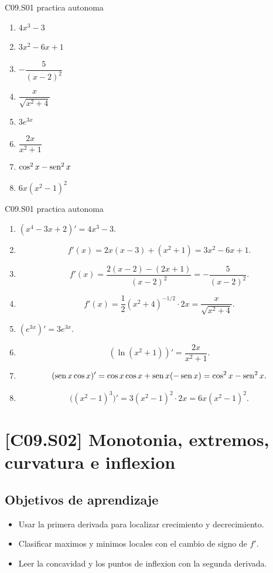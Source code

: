 \begin{shortanswer}{C09.S01 practica autonoma}
\begin{enumerate}[label=\textbf{PX-C09.S01-\arabic*:}, leftmargin=*]
  \item \(4x^3-3\)
  \item \(3x^2-6x+1\)
  \item \(-\dfrac{5}{(x-2)^2}\)
  \item \(\dfrac{x}{\sqrt{x^2+4}}\)
  \item \(3e^{3x}\)
  \item \(\dfrac{2x}{x^2+1}\)
  \item \(\cos^2 x-\operatorname{sen}^2 x\)
  \item \(6x(x^2-1)^2\)
\end{enumerate}
\end{shortanswer}

\begin{fullsolution}{C09.S01 practica autonoma}
\begin{enumerate}[label=\textbf{PX-C09.S01-\arabic*:}, leftmargin=*]
  \item \((x^4-3x+2)'=4x^3-3\).
  \item
  \[
  f'(x)=2x(x-3)+(x^2+1)=3x^2-6x+1.
  \]
  \item
  \[
  f'(x)=\frac{2(x-2)-(2x+1)}{(x-2)^2}=-\frac{5}{(x-2)^2}.
  \]
  \item
  \[
  f'(x)=\frac{1}{2}(x^2+4)^{-1/2}\cdot 2x=\frac{x}{\sqrt{x^2+4}}.
  \]
  \item \((e^{3x})'=3e^{3x}\).
  \item
  \[
  (\ln(x^2+1))'=\frac{2x}{x^2+1}.
  \]
  \item
  \[
  (\operatorname{sen} x\cos x)'=\cos x\cos x+\operatorname{sen} x(-\operatorname{sen} x)=\cos^2 x-\operatorname{sen}^2 x.
  \]
  \item
  \[
  \bigl((x^2-1)^3\bigr)'=3(x^2-1)^2\cdot 2x=6x(x^2-1)^2.
  \]
\end{enumerate}
\end{fullsolution}

\section{[C09.S02] Monotonia, extremos, curvatura e inflexion}

\subsection*{Objetivos de aprendizaje}
\begin{itemize}
  \item Usar la primera derivada para localizar crecimiento y decrecimiento.
  \item Clasificar maximos y minimos locales con el cambio de signo de \(f'\).
  \item Leer la concavidad y los puntos de inflexion con la segunda derivada.
\end{itemize}

